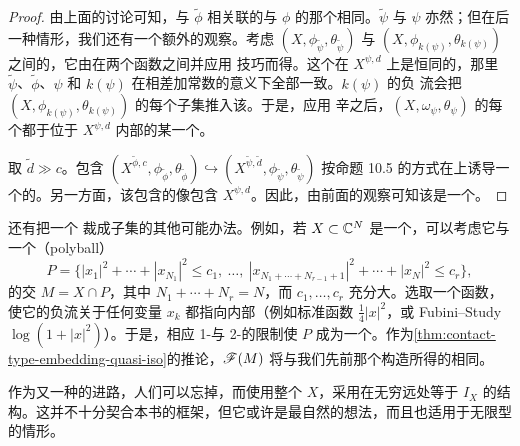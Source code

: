 \begin{proof}
由上面的讨论可知，与 $\tilde{\phi}$ 相关联的\trFukayaCategory{}与 $\phi$ 的那个相同。$\tilde{\psi}$ 与 $\psi$ 亦然；但在后一种情形，我们还有一个额外的观察。考虑 $(X,\phi_{\tilde{\psi}},\theta_{\tilde{\psi}})$ 与 $(X,\phi_{k(\psi)},\theta_{k(\psi)})$ 之间的\trSymplectic{}\trIsomorphism，它由在两个函数之间\trInterpolation{}并应用 \trMoser{}技巧而得。这个\trIsomorphism{}在 $X^{\psi,d}$ 上是恒同的，那里 $\tilde{\psi}$、$\tilde{\phi}$、$\psi$ 和 $k(\psi)$ 在相差加常数的意义下全部一致。$k(\psi)$ 的负 \trLiouville{}流会把 $(X,\phi_{k(\psi)},\theta_{k(\psi)})$ 的每个\trCompact{}子集推入该\trSublevelSet。于是，应用 \trMoser{}辛\trIsomorphism{}之后，$(X,\omega_\psi,\theta_\psi)$ 的每个\trExact{}\trLagrange{}\trSubmanifold{}都\trIsotopy{}于位于 $X^{\psi,d}$ 内部的某一个。

取 $\tilde{d}\gg c$。包含 $(X^{\tilde{\phi},c},\phi_{\tilde{\phi}},\theta_{\tilde{\phi}})\hookrightarrow(X^{\tilde{\psi},\tilde{d}},\phi_{\tilde{\psi}},\theta_{\tilde{\psi}})$ 按命题 10.5 的方式在\trFukayaCategory{}上诱导一个\trCohomology{}\trFullyFaithful{}的\trFunctor。另一方面，该包含的像包含 $X^{\psi,d}$。因此，由前面的观察可知该\trFunctor{}是一个\trQuasiequivalence。
\end{proof}
\begin{remark}\label{thm:polyball-alternative}
还有把一个 \trStein{}\trManifold{}裁成\trCompact{}子集的其他可能办法。例如，若 $X\subset\mathbb{C}^N$ 是一个\trAffineVariety，可以考虑它与一个\textbf{\trPolyball}（polyball）
\begin{equation*}
P=\{|x_1|^2+\cdots+|x_{N_1}|^2\le c_1,\ \ldots,\ |x_{N_1+\cdots+N_{r-1}+1}|^2+\cdots+|x_N|^2\le c_r\},
\end{equation*}
的交 $M=X\cap P$，其中 $N_1+\cdots+N_r=N$，而 $c_1,\ldots,c_r$ 充分大。选取一个\trPlurisubharmonic{}函数，使它的负\trLiouville{}流关于任何变量 $x_k$ 都指向内部（例如标准函数 $\tfrac14|x|^2$，或 Fubini--Study \trKaehlerPotential{}$\log(1+|x|^2)$）。于是，相应 1-\trForm{}与 2-\trForm{}的限制使 $P$ 成为一个\trExactSymplectic\trCorneredBoundary\trManifold。作为\cref{thm:contact-type-embedding-quasi-iso}的推论，\trFukayaCategory{}$\mathscr{F}(M)$ 将与我们先前那个构造所得的相同。

作为又一种\trEquivalence{}的进路，人们可以忘掉\trCompactness，而使用整个 $X$，采用在无穷远处等于 $I_X$ 的\trAlmostComplex{}结构。这并不十分契合本书的框架，但它或许是最自然的想法，而且也适用于无限型的情形。
\end{remark}
